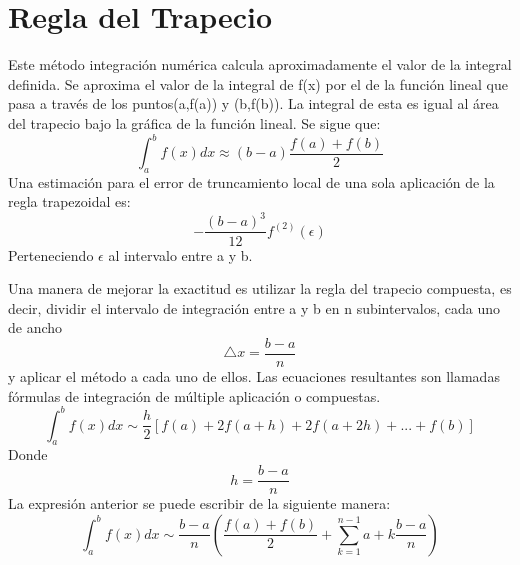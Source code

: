 


\section{Regla del Trapecio}
\label{2:sec:1}
\parindent=0.5cm
\raggedright
Este método integración numérica calcula aproximadamente el valor de la integral definida. 
Se aproxima el valor de la integral de f(x) por el de la función lineal que pasa 
a través de los puntos(a,f(a)) y (b,f(b)). La integral de esta es igual al área del 
trapecio bajo la gráfica de la función lineal. Se sigue que: 
\[
\int_{a}^{b} f(x)dx \approx\left(b-a\right)\frac{f(a)+f(b)}{2} 
\]
Una estimación para el error de truncamiento local de una sola aplicación de la regla trapezoidal es:
\[
-\frac{\left(b-a\right)^3}{12}  \displaystyle f^{(2)}(\epsilon)
\]
Perteneciendo $\epsilon$ al intervalo entre a y b.


\parindent=0.5cm
\raggedright
Una manera de mejorar la exactitud es utilizar la regla del trapecio compuesta, es decir, dividir
el intervalo de integración entre a y b en n subintervalos, cada uno de ancho
\[
\bigtriangleup{x}=\frac{b-a}{n}
\]
y aplicar el método a cada uno de ellos. Las ecuaciones resultantes son llamadas fórmulas
de integración de múltiple aplicación o compuestas.
\[
\int_{a}^{b} f(x)dx \sim\frac{h}{2}\left[f(a) + 2f(a+h) + 2f(a+2h) + ... + f(b)\right]
\]
Donde 
\[
h=\frac{b-a}{n} 
\]
La expresión anterior se puede escribir de la siguiente manera:
\[
\int_{a}^{b} f(x)dx \sim\frac{b-a}{n}\left(\frac{f(a)+f(b)}{2} + \sum_{k=1}^{n-1} a+k\frac{b-a}{n} \right)
\]

